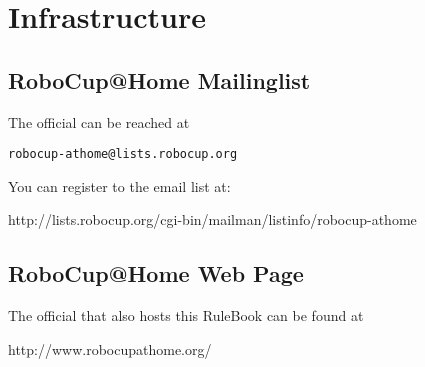 \section{Infrastructure}
\label{sec:infrastructure}
\subsection{RoboCup@Home Mailinglist}
The official  can be reached at
\begin{center}
\texttt{robocup-athome@lists.robocup.org}
\end{center}
You can register to the email list at:
\begin{center}
http://lists.robocup.org/cgi-bin/mailman/listinfo/robocup-athome
\end{center}

\subsection{RoboCup@Home Web Page}
The official  that also hosts this RuleBook can be found at \\
\begin{center}
http://www.robocupathome.org/
\end{center}


